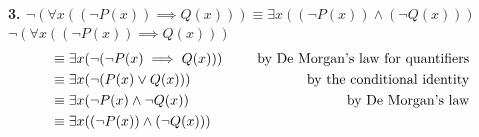\documentclass{report}
\theoremstyle{mytheoremstyle}
\theoremstyle{mytheoremstyle}
\theoremstyle{myproblemstyle}
\begin{document}
\\[\baselineskip]
\noindent\textbf{3. $\neg (\forall x ((\neg P(x)) \implies Q(x))) \equiv \exists x ((\neg P(x)) \land (\neg Q(x)))$} 
\\[\baselineskip]
$\neg (\forall x ((\neg P(x)) \implies Q(x)))$
\begin{align}
    &\equiv \exists x (\neg (\neg P(x) \implies Q(x))) &\text{\indent by De Morgan's law for quantifiers} \\
    &\equiv \exists x (\neg (P(x) \lor Q(x))) &\text{\indent by the conditional identity} \\
    &\equiv \exists x (\neg P(x) \land \neg Q(x)) &\text{\indent by De Morgan's law} \\
    &\equiv \exists x ((\neg P(x)) \land (\neg Q(x)))
\end{align}
\newpage
\end{document}
